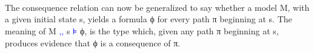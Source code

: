 \documentclass{article}
\newcommand{\blue}[1]{\textcolor{blue}{#1}}
\begin{document}
\begin{code}
\AgdaSpace{}%
\AgdaSpace{}%
\AgdaSpace{}%
\AgdaSpace{}%
\AgdaSpace{}%
\<%
\\
%
\>[4]\AgdaSpace{}%
\AgdaSpace{}%
\AgdaSymbol{(}\AgdaSpace{}%
\AgdaSpace{}%
\AgdaSymbol{)}\AgdaSpace{}%
\AgdaSymbol{=}\AgdaSpace{}%
\AgdaSpace{}%
\AgdaSpace{}%
\AgdaSpace{}%
\AgdaSpace{}%
\AgdaSpace{}%
\AgdaSpace{}%
\AgdaSpace{}%
\<%
\end{code}


\begin{code}[hide]%
\>[0]\AgdaSpace{}%
\AgdaSpace{}%
\AgdaSymbol{(}\AgdaSpace{}%
\AgdaSymbol{:}\AgdaSpace{}%
\AgdaSymbol{)}%
\>[27]\<%
\\
%
\\[\AgdaEmptyExtraSkip]%
\>[0][@{}l@{\AgdaIndent{0}}]%
\>[2]\AgdaSpace{}%
\AgdaSpace{}%
\AgdaSpace{}%
\<%
\end{code}

The consequence relation can now be generalized to say whether a model M, with a
given initial state s, yields a formula ϕ for every path π beginning at s. The
meaning of M \blue{,,} s \blue{⊧} ϕ, is the type which, given any path π
beginning at s, produces evidence that ϕ is a consequence of π.
\end{document}
